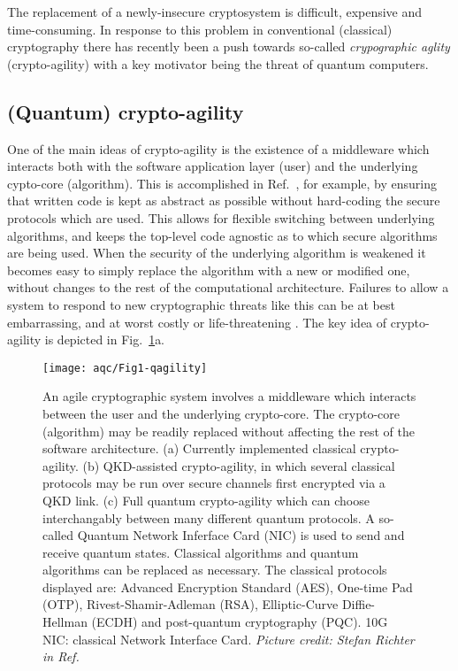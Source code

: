 The replacement of a newly-insecure cryptosystem is difficult, expensive and time-consuming. In response to this problem in conventional (classical) cryptography there has recently been a push towards so-called \emph{crypographic aglity} (crypto-agility) \cite{Sullivan2009, Chen2016} with a key motivator being the threat of quantum computers. %

\subsection{(Quantum) crypto-agility}

One of the main ideas of crypto-agility is the existence of a middleware which interacts both with the software application layer (user) and the underlying cypto-core (algorithm). This is accomplished in Ref.~\cite{Sullivan2009}, for example, by ensuring that written code is kept as abstract as possible without hard-coding the secure protocols which are used. This allows for flexible switching between underlying algorithms, and keeps the top-level code agnostic as to which secure algorithms are being used. When the security of the underlying algorithm is weakened it becomes easy to simply replace the algorithm with a new or modified one, without changes to the rest of the computational architecture. Failures to allow a system to respond to new cryptographic threats like this can be at best embarrassing, and at worst costly or life-threatening \cite{Schneier2016, Schneier2017}. The key idea of crypto-agility is depicted in Fig.~\ref{fig:agility}a. 


\begin{figure}[htp]
\captionsetup{width=0.8\linewidth}
\centering
\texttt{[image: aqc/Fig1-qagility]}
\caption{\label{fig:agility} An agile cryptographic system involves a middleware which interacts between the user and the underlying crypto-core. The crypto-core (algorithm) may be readily replaced without affecting the rest of the software architecture. (a) Currently implemented classical crypto-agility. (b) QKD-assisted crypto-agility, in which several classical protocols may be run over secure channels first encrypted via a QKD link. (c) Full quantum crypto-agility which can choose interchangably between many different quantum protocols. A so-called Quantum Network Inferface Card (NIC) is used to send and receive quantum states. Classical algorithms and quantum algorithms can be replaced as necessary. The classical protocols displayed are: Advanced Encryption Standard (AES), One-time Pad (OTP), Rivest-Shamir-Adleman (RSA), Elliptic-Curve Diffie-Hellman (ECDH) and post-quantum cryptography (PQC). 10G NIC: classical Network Interface Card. \emph{Picture credit: Stefan Richter in Ref.~\cite{Richter2020}}}
\end{figure}


